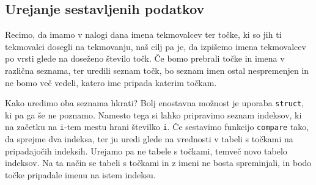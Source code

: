 \documentclass{article}
\begin{document}
\subsection{Urejanje sestavljenih podatkov}

Recimo, da imamo v nalogi dana imena tekmovalcev ter točke, ki so jih ti
tekmovalci dosegli na tekmovanju, naš cilj pa je, da izpišemo imena tekmovalcev
po vrsti glede na doseženo število točk. Če bomo prebrali točke in imena v
različna seznama, ter uredili seznam točk, bo seznam imen ostal nespremenjen in
ne bomo več vedeli, katero ime pripada katerim točkam.

Kako uredimo oba seznama hkrati? Bolj enostavna možnost je uporaba \verb+struct+,
ki pa ga še ne poznamo. Namesto tega si lahko pripravimo seznam indeksov, ki
na začetku na \verb+i+-tem mestu hrani številko \verb+i+. Če sestavimo funkcijo
\verb+compare+ tako, da sprejme dva indeksa, ter ju uredi glede na vrednosti
v tabeli s točkami na pripadajočih indeksih. Urejamo pa ne tabele s točkami,
temveč novo tabelo indeksov.
Na ta način se tabeli s točkami in z imeni ne bosta spreminjali,
in bodo točke pripadale imenu na istem indeksu.
\end{document}
